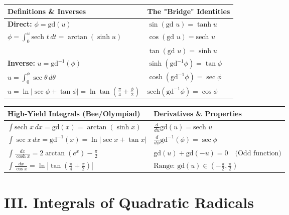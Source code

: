 \documentclass[11pt, a4paper]{article}
\begin{document}
\begin{center}
\begin{tabular}{@{}p{} p{}@{}}
\toprule
\textbf{Definitions \& Inverses} & \textbf{The "Bridge" Identities} \\
\midrule
\textbf{\color{accent}Direct:} $\phi = \text{gd}(u)$ & $\sin(\text{gd } u) = \tanh u$ \\
$\phi = \int_0^u \text{sech } t \, dt = \arctan(\sinh u)$ & $\cos(\text{gd } u) = \text{sech } u$ \\
& $\tan(\text{gd } u) = \sinh u$ \\
\textbf{\color{accent}Inverse:} $u = \text{gd}^{-1}(\phi)$ & $\sinh(\text{gd}^{-1} \phi) = \tan \phi$ \\
$u = \int_0^\phi \sec \theta \, d\theta$ & $\cosh(\text{gd}^{-1} \phi) = \sec \phi$ \\
$u = \ln|\sec \phi + \tan \phi| = \ln \tan\left(\frac{\pi}{4}+\frac{\phi}{2}\right)$ & $\text{sech}(\text{gd}^{-1} \phi) = \cos \phi$ \\
\bottomrule
\end{tabular}
\end{center}

\vspace{0.2cm}

\begin{center}
\begin{tabular}{@{}p{} p{}@{}}
\toprule
\textbf{High-Yield Integrals (Bee/Olympiad)} & \textbf{Derivatives \& Properties} \\
\midrule
$\int \text{sech } x \, dx = \text{gd}(x) = \arctan(\sinh x)$ & $\frac{d}{du} \text{gd}(u) = \text{sech } u$ \\
$\int \sec x \, dx = \text{gd}^{-1}(x) = \ln|\sec x + \tan x|$ & $\frac{d}{d\phi} \text{gd}^{-1}(\phi) = \sec \phi$ \\
$\int \frac{dx}{\cosh x} = 2\arctan(e^x) - \frac{\pi}{2}$ & $\text{gd}(u) + \text{gd}(-u) = 0 \quad \text{(Odd function)}$ \\
$\int \frac{dx}{\cos x} = \ln\left|\tan\left(\frac{\pi}{4} + \frac{x}{2}\right)\right|$ & $\text{Range: } \text{gd}(u) \in \left(-\frac{\pi}{2}, \frac{\pi}{2}\right)$ \\
\bottomrule
\end{tabular}
\end{center}

\vspace{0.3cm}


\section*{\color{primary} III. Integrals of Quadratic Radicals}
\end{document}
